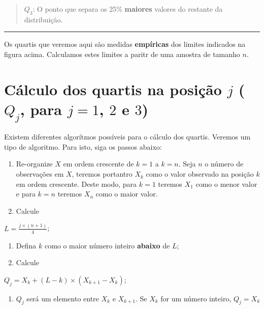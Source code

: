 \documentclass[
]{book}
\providecommand{\tightlist}{%
  \setlength{\itemsep}{0pt}\setlength{\parskip}{0pt}}
\begin{document}
\begin{quote}
\(Q_{3}\): O ponto que separa os 25\% \textbf{maiores} valores do restante da distribuição.
\end{quote}

\begin{center}\rule{0.5\linewidth}{0.5pt}\end{center}

Os quartis que veremos aqui são medidas \textbf{empíricas} dos limites indicados na figura acima. Calculamos estes limites a paritr de uma amostra de tamanho \(n\).

\hypertarget{cuxe1lculo-dos-quartis-na-posiuxe7uxe3o-j-q_j-para-j-1-2-e-3}{%
\section{\texorpdfstring{Cálculo dos quartis na posição \(j\) (\(Q_j\), para \(j = 1\), \(2\) e \(3\))}{Cálculo dos quartis na posição j (Q\_j, para j = 1, 2 e 3)}}\label{cuxe1lculo-dos-quartis-na-posiuxe7uxe3o-j-q_j-para-j-1-2-e-3}}

Existem diferentes algorítmos possíveis para o cálculo dos quartis. Veremos um tipo de algoritmo. Para isto, siga os passos abaixo:

\begin{enumerate}
\def\labelenumi{\arabic{enumi}.}
\item
  Re-organize \(X\) em ordem crescente de \(k = 1\) a \(k = n\). Seja \(n\) o número de observações em \(X\), teremos portantro \(X_k\) como o valor observado na posição \(k\) em ordem crescente. Deste modo, para \(k = 1\) teremos \(X_1\) como o menor valor e para \(k = n\) teremos \(X_n\) como o maior valor.
\item
  Calcule
\end{enumerate}

\(L = \frac{j \times (n+1)}{4}\);

\begin{enumerate}
\def\labelenumi{\arabic{enumi}.}
\setcounter{enumi}{2}
\item
  Defina \(k\) como o maior número inteiro \textbf{abaixo} de \(L\);
\item
  Calcule
\end{enumerate}

\(Q_j = X_k + (L - k) \times (X_{k+1}-X_k)\);

\begin{enumerate}
\def\labelenumi{\arabic{enumi}.}
\setcounter{enumi}{4}
\tightlist
\item
  \(Q_j\) será um elemento entre \(X_k\) e \(X_{k+1}\). Se \(X_k\) for um número inteiro, \(Q_j = X_k\)
\end{enumerate}
\end{document}
